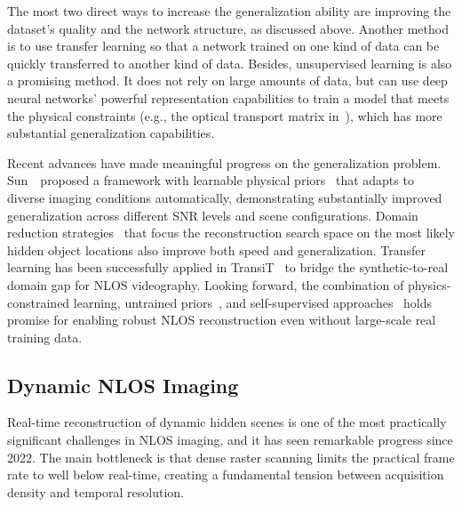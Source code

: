 The most two direct ways to increase the generalization ability are improving the dataset's quality and the network structure, as discussed above. Another method is to use transfer learning so that a network trained on one kind of data can be quickly transferred to another kind of data. Besides, unsupervised learning is also a promising method. It does not rely on large amounts of data, but can use deep neural networks' powerful representation capabilities to train a model that meets the physical constraints (e.g., the optical transport matrix in~\cite{aittalaComputationalMirrorsBlind2019}), which has more substantial generalization capabilities.

Recent advances have made meaningful progress on the generalization problem. Sun~\etal~proposed a framework with learnable physical priors~\cite{sunGeneralizable2025} that adapts to diverse imaging conditions automatically, demonstrating substantially improved generalization across different SNR levels and scene configurations. Domain reduction strategies~\cite{shimDomainReduction2024} that focus the reconstruction search space on the most likely hidden object locations also improve both speed and generalization. Transfer learning has been successfully applied in TransiT~\cite{liTransiT2025} to bridge the synthetic-to-real domain gap for NLOS videography. Looking forward, the combination of physics-constrained learning, untrained priors~\cite{wuUntrainedDecoder2022}, and self-supervised approaches~\cite{cuiVirtualScanning2024} holds promise for enabling robust NLOS reconstruction even without large-scale real training data.

\subsection{Dynamic NLOS Imaging}
\label{sec:dynamicNLOS}
Real-time reconstruction of dynamic hidden scenes is one of the most practically significant challenges in NLOS imaging, and it has seen remarkable progress since 2022. The main bottleneck is that dense raster scanning limits the practical frame rate to well below real-time, creating a fundamental tension between acquisition density and temporal resolution.

